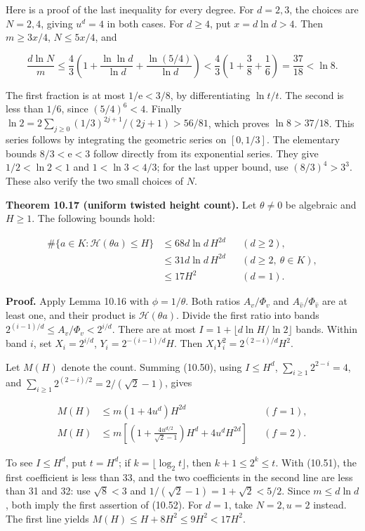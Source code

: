 \documentclass[
  11pt,
  a4paper,
]{article}
\begin{document}
Here is a proof of the last inequality for every degree. For \(d=2,3\),
the choices are \(N=2,4\), giving \(u^d=4\) in both cases. For
\(d\ge4\), put \(x=d\ln d>4\). Then \(m\ge3x/4\), \(N\le5x/4\), and

\[
\frac{d\ln N}{m}
\le\frac43\left(1+\frac{\ln\ln d}{\ln d}
+\frac{\ln(5/4)}{\ln d}\right)
<\frac43\left(1+\frac38+\frac16\right)=\frac{37}{18}<\ln8.
\]

The first fraction is at most \(1/\mathrm e<3/8\), by differentiating
\(\ln t/t\). The second is less than \(1/6\), since \((5/4)^6<4\).
Finally \(\ln2=2\sum_{j\ge0}(1/3)^{2j+1}/(2j+1)>56/81\), which proves
\(\ln8>37/18\). This series follows by integrating the geometric series
on \([0,1/3]\). The elementary bounds \(8/3<\mathrm e<3\) follow
directly from its exponential series. They give \(1/2<\ln2<1\) and
\(1<\ln3<4/3\); for the last upper bound, use \((8/3)^4>3^3\). These
also verify the two small choices of \(N\).

\textbf{Theorem 10.17 (uniform twisted height count).} Let
\(\theta\ne0\) be algebraic and \(H\ge1\). The following bounds hold:

\[
\begin{aligned}
\#\{a\in K:\mathcal H(\theta a)\le H\}
&\le68d\ln d\,H^{2d} &&(d\ge2),\\
&\le31d\ln d\,H^{2d} &&(d\ge2,\ \theta\in K),\\
&\le17H^2 &&(d=1).
\end{aligned}
\tag{10.52}
\]

\textbf{Proof.} Apply Lemma 10.16 with \(\phi=1/\theta\). Both ratios
\(A_v/\Phi_v\) and \(A_{\widehat v}/\Phi_{\widehat v}\) are at least
one, and their product is \(\mathcal H(\theta a)\). Divide the first
ratio into bands \(2^{(i-1)/d}\le A_v/\Phi_v<2^{i/d}\). There are at
most \(I=1+\lfloor d\ln H/\ln2\rfloor\) bands. Within band \(i\), set
\(X_i=2^{i/d}\), \(Y_i=2^{-(i-1)/d}H\). Then
\(X_iY_i^2=2^{(2-i)/d}H^2\).

Let \(M(H)\) denote the count. Summing (10.50), using \(I\le H^d\),
\(\sum_{i\ge1}2^{2-i}=4\), and \(\sum_{i\ge1}2^{(2-i)/2}=2/(\sqrt2-1)\),
gives

\[
\begin{aligned}
M(H)&\le m(1+4u^d)H^{2d} &&(f=1),\\
M(H)&\le m\left[
\left(1+\frac{4u^{d/2}}{\sqrt2-1}\right)H^d
+4u^dH^{2d}\right] &&(f=2).
\end{aligned}
\tag{10.53}
\]

To see \(I\le H^d\), put \(t=H^d\); if \(k=\lfloor\log_2t\rfloor\), then
\(k+1\le2^k\le t\). With (10.51), the first coefficient is less than 33,
and the two coefficients in the second line are less than 31 and 32: use
\(\sqrt8<3\) and \(1/(\sqrt2-1)=1+\sqrt2<5/2\). Since \(m\le d\ln d\),
both imply the first assertion of (10.52). For \(d=1\), take \(N=2,u=2\)
instead. The first line yields \(M(H)\le H+8H^2\le9H^2<17H^2\).
\end{document}
